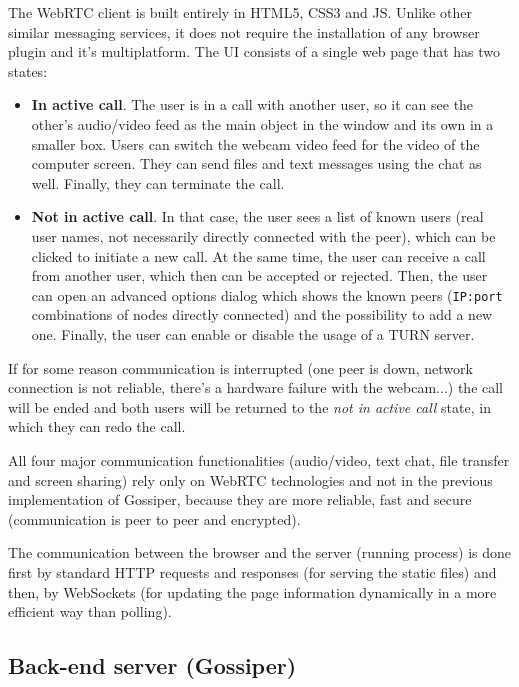\documentclass[paper=a4, fontsize=11pt]{scrartcl} %
\numberwithin{equation}{section} %
\numberwithin{figure}{section} %
\numberwithin{table}{section} %
\begin{document}
The WebRTC client is built entirely in HTML5, CSS3 and JS. Unlike other similar messaging services, it does not require the installation of any browser plugin and it's multiplatform. The UI consists of a single web page that has two states:

\begin{itemize}
	\item \textbf{In active call}. The user is in a call with another user, so it can see the other's audio/video feed as the main object in the window and its own in a smaller box. Users can switch the webcam video feed for the video of the computer screen. They can send files and text messages using the chat as well. Finally, they can terminate the call.
	\item \textbf{Not in active call}. In that case, the user sees a list of known users (real user names, not necessarily directly connected with the peer), which can be clicked to initiate a new call. At the same time, the user can receive a call from another user, which then can be accepted or rejected. Then, the user can open an advanced options dialog which shows the known peers (\verb|IP:port| combinations of nodes directly connected) and the possibility to add a new one. Finally, the user can enable or disable the usage of a TURN server.
\end{itemize}

If for some reason communication is interrupted (one peer is down, network connection is not reliable, there's a hardware failure with the webcam...) the call will be ended and both users will be returned to the \textit{not in active call} state, in which they can redo the call.

All four major communication functionalities (audio/video, text chat, file transfer and screen sharing) rely only on WebRTC technologies and not in the previous implementation of Gossiper, because they are more reliable, fast and secure (communication is peer to peer and encrypted). 

The communication between the browser and the server (running process) is done first by standard HTTP requests and responses (for serving the static files) and then, by WebSockets (for updating the page information dynamically in a more efficient way than polling).

\subsection{Back-end server (Gossiper)}
\end{document}
